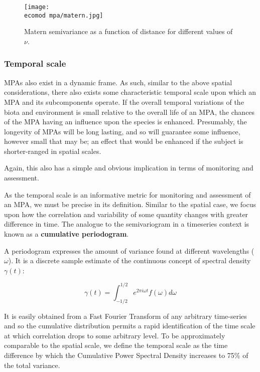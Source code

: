 \documentclass[letterpaper,portrait,11pt]{scrartcl}
\numberwithin{equation}{section}		%
\numberwithin{figure}{section}		%
\numberwithin{table}{section}				%
\newcommand{\ecomod}{\string~/ecomod_data/}   %
\begin{document}
\begin{figure}
  \label{fig:matern}
  \centering
  \texttt{[image: \\ecomod mpa/matern.jpg]}
  \caption{Matern semivariance as a function of distance for different values of $\nu$.}
\end{figure}


\subsubsection{Temporal scale}
\label{sec:interpolationTS}

MPAs also exist in a dynamic frame. As such, similar to the above spatial considerations, there also exists some characteristic temporal scale upon which an MPA and its subcomponents operate. If the overall temporal variations of the biota and environment is small relative to the overall life of an MPA, the chances of the MPA having an influence upon the species is enhanced. Presumably, the longevity of MPAs will be long lasting, and so will guarantee some influence, however small that may be; an effect that would be enhanced if the subject is shorter-ranged in spatial scales.

Again, this also has a simple and obvious implication in terms of monitoring and assessment. 

As the temporal scale is an informative metric for monitoring and assessment of an MPA, we must be precise in its definition. Similar to the spatial case, we focus upon how the correlation and variability of some quantity changes with greater difference in time. The analogue to the semivariogram in a timeseries context is known as a \textbf{cumulative periodogram}. 

A periodogram expresses the amount of variance found at different wavelengths ($\omega$). It is a discrete sample estimate of the continuous concept of spectral density $\gamma(t)$: 

\begin{equation}
  \label{eq:spectraldDensity}
  \gamma(t) = \int_{-1/2}^{1/2} e^{2\pi i \omega t} f(\omega) d \omega
\end{equation}

It is easily obtained from a Fast Fourier Transform of any arbitrary time-series and so the cumulative distribution permits a rapid identification of the time scale at which correlation drops to some arbitrary level. To be approximately comparable to the spatial scale, we define the temporal scale as the time difference by which the Cumulative Power Spectral Density increases to 75\% of the total variance.
\end{document}
